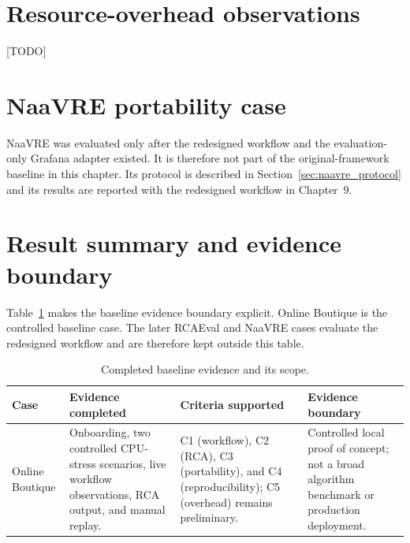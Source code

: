 \section{Resource-overhead observations}
[TODO]


\section{NaaVRE portability case}
\label{sec:naavre_results}

NaaVRE was evaluated only after the redesigned workflow and the evaluation-only Grafana adapter existed. It is therefore not part of the original-framework baseline in this chapter. Its protocol is described in Section~\ref{sec:naavre_protocol} and its results are reported with the redesigned workflow in Chapter~9.

\section{Result summary and evidence boundary}
Table~\ref{tab:baseline_evidence_summary} makes the baseline evidence boundary explicit. Online Boutique is the controlled baseline case. The later RCAEval and NaaVRE cases evaluate the redesigned workflow and are therefore kept outside this table.

\begin{table}[htbp]
    \centering
    \small
    \caption{Completed baseline evidence and its scope.}
    \label{tab:baseline_evidence_summary}
    \begin{tabular}{p{} p{} p{} p{}}
        \toprule
        \textbf{Case} & \textbf{Evidence completed} & \textbf{Criteria supported} & \textbf{Evidence boundary} \\
        \midrule
        Online Boutique & Onboarding, two controlled CPU-stress scenarios, live workflow observations, RCA output, and manual replay. & C1 (workflow), C2 (RCA), C3 (portability), and C4 (reproducibility); C5 (overhead) remains preliminary. & Controlled local proof of concept; not a broad algorithm benchmark or production deployment. \\
        \bottomrule
    \end{tabular}
\end{table}

